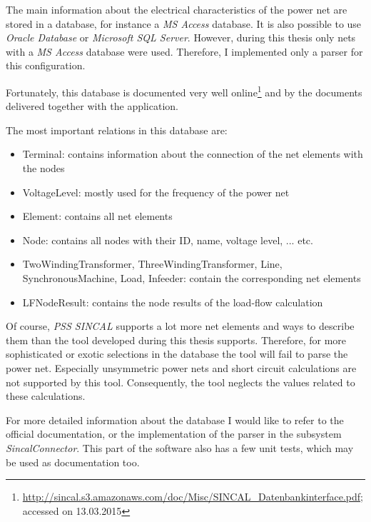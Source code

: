 The main information about the electrical characteristics of the power net are stored in a database, for instance a \emph{MS Access} database. It is also possible to use \emph{Oracle Database} or \emph{Microsoft SQL Server}. However, during this thesis only nets with a \emph{MS Access} database were used. Therefore, I implemented only a parser for this configuration.

Fortunately, this database is documented very well online\footnote{\url{http://sincal.s3.amazonaws.com/doc/Misc/SINCAL\_Datenbankinterface.pdf}; accessed on 13.03.2015} and by the documents delivered together with the application.

The most important relations in this database are:
\begin{itemize}
	\item Terminal: contains information about the connection of the net elements with the nodes
	\item VoltageLevel: mostly used for the frequency of the power net
	\item Element: contains all net elements
	\item Node: contains all nodes with their ID, name, voltage level, ... etc.
	\item TwoWindingTransformer, ThreeWindingTransformer, Line, SynchronousMachine, Load, Infeeder: contain the corresponding net elements
	\item LFNodeResult: contains the node results of the load-flow calculation
\end{itemize}

Of course, \emph{PSS SINCAL} supports a lot more net elements and ways to describe them than the tool developed during this thesis supports. Therefore, for more sophisticated or exotic selections in the database the tool will fail to parse the power net. Especially unsymmetric power nets and short circuit calculations are not supported by this tool. Consequently, the tool neglects the values related to these calculations.

For more detailed information about the database I would like to refer to the official documentation, or the implementation of the parser in the subsystem \emph{SincalConnector}. This part of the software also has a few unit tests, which may be used as documentation too.